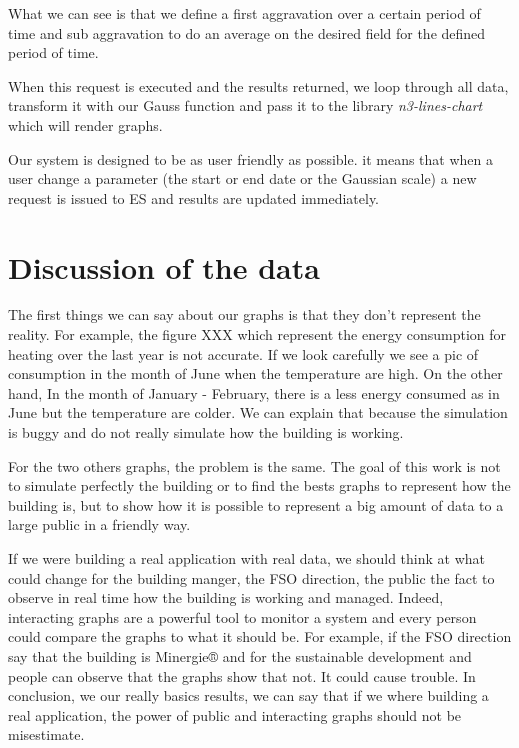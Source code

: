 \documentclass{acm_proc_article-sp}
\begin{document}


What we can see is that we define a first aggravation over a certain period of time and sub aggravation to do an average on the desired field for the defined period of time.

When this request is executed and the results returned, we loop through all data, transform it with our Gauss function and pass it to the library \emph{n3-lines-chart} which will render graphs.

Our system is designed to be as user friendly as possible. it means that when a user change a parameter (the start or end date or the Gaussian scale) a new request is issued to ES and results are updated immediately.

\section{Discussion of the data}
\label{discuss}
The first things we can say about our graphs is that they don’t represent the reality. For example, the figure XXX which represent the energy consumption for heating over the last year is not accurate. If we look carefully we see a pic of consumption in the month of June when the temperature are high. On the other hand, In the month of January - February, there is a less energy consumed as in June but the temperature are colder. We can explain that because the simulation is buggy and do not really simulate how the building is working.

For the two others graphs, the problem is the same. The goal of this work is not to simulate perfectly the building or to find the bests graphs to represent how the building is, but to show how it is possible to represent a big amount of data to a large public in a friendly way.

If we were building a real application with real data, we should think at what could change for the building manger, the FSO direction, the public the fact to observe in real time how the building is working and managed. Indeed, interacting graphs are a powerful tool to monitor a system and every person could compare the graphs to what it should be. For example, if the FSO direction say that the building is Minergie® and for the sustainable development and people can observe that the graphs show that not. It could cause trouble. In conclusion, we our really basics results, we can say that if we where building a real application, the power of public and interacting graphs should not be misestimate.
\end{document}
